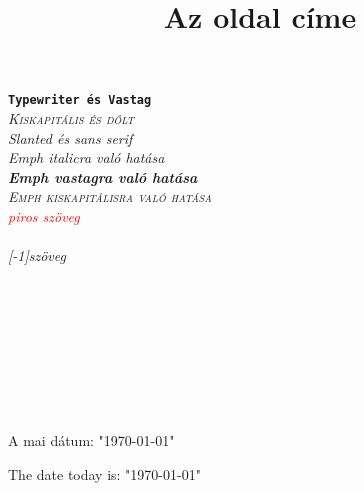\documentclass{article}
\title{Az oldal címe}
\begin{document}
\maketitle
\texttt{\textbf{Typewriter és Vastag}} %
\\
\textsc{\em{Kiskapitális és dőlt}} 
\\
\textsl{\textsf{Slanted és sans serif}} %
\\
\em{\emph{Emph italicra való hatása}}
\\
\textbf{\emph{Emph vastagra való hatása}}
\\
\textsc{\emph{Emph kiskapitálisra való hatása}}
\\
\textcolor{red}{piros szöveg}
\\
\\
\scalebox{2}[-1]{szöveg} %
\\
\\
\\
\colorbox{black}{\color{white}{helo}}
\\
\\
\colorbox{black}{\parbox{15cm}{}}
\\
\\
\begin{flushright}
\end{flushright}
\linespread{2}
\selectfont
\\
\linespread{1}
A mai dátum: "\today"

The date today is: "\today"
\end{document}
